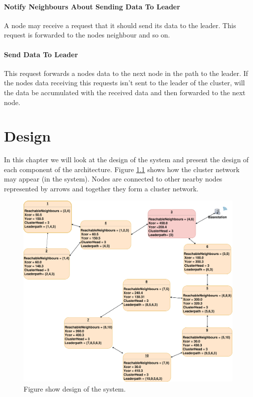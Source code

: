 \documentclass[USenglish]{uit-thesis}
\begin{document}
\subsubsection{Notify Neighbours About Sending Data To Leader}
A node may receive a request that it should send its data to the leader. This request is forwarded to the nodes neighbour and so on.

\subsubsection{Send Data To Leader}
This request forwards a nodes data to the next node in the path to the leader. If the nodes data receiving this requests isn't sent to the leader of the cluster, will the data be accumulated with the received data and then forwarded to the next node.



\chapter{Design}

In this chapter we will look at the design of the system and present the design of each component of the architecture. Figure \ref{fig:design} shows how the cluster network may appear (in the system). Nodes are connected to other nearby nodes represented by arrows and together they form a cluster network.

\begin{figure}
\centering
\includegraphics[width=\textwidth]{design.png}
\caption{Figure show design of the system.}
\label{fig:design}
\end{figure}
\end{document}
